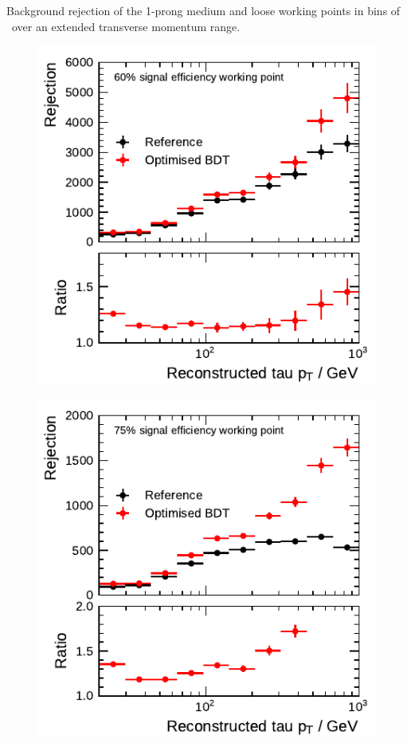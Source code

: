 \begin{minipage}{\textwidth}
\begin{subfigure}{0.48\textwidth}
  \end{subfigure}
  \caption[Background rejection of the 1-prong medium and loose working points
  in bins of \tauhadvis~\pt for the BDT-based identification (extended
  \tauhadvis~\pt range)]{Background rejection of the 1-prong medium and loose
    working points in bins of \tauhadvis~\pt over an extended transverse
    momentum range.}
\end{minipage}

\noindent
\begin{minipage}{\textwidth}
  \centering
  \captionsetup{type=figure}
  \begin{subfigure}{0.48\textwidth}
    \centering
    \includegraphics{./figures/bdt_perf/post_optimisation/3p_highpt/rejection_medium_ratio_highpt.pdf}
  \end{subfigure}\hfill
  \begin{subfigure}{0.48\textwidth}
    \centering
    \includegraphics{./figures/bdt_perf/post_optimisation/3p_highpt/rejection_loose_ratio_highpt.pdf}

\end{subfigure}
\end{minipage}
